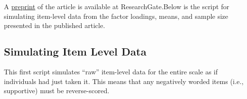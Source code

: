 \documentclass[
  english,
]{book}
\begin{document}
A \href{https://www.researchgate.net/publication/332062781_Perceptions_of_the_LGBTQ_College_Campus_Climate_Scale_Development_and_Psychometric_Evaluation/link/5ca0bef945851506d7377da7/download}{preprint} of the article is available at ResearchGate.Below is the script for simulating item-level data from the factor loadings, means, and sample size presented in the published article.

\hypertarget{simulating-item-level-data}{%
\subsection{Simulating Item Level Data}\label{simulating-item-level-data}}

This first script simulates ``raw'' item-level data for the entire scale as if individuals had just taken it. This means that any negatively worded items (i.e., supportive) must be reverse-scored.
\end{document}
